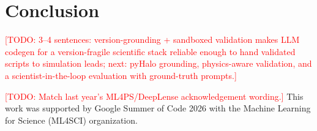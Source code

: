 \documentclass{article}
\newcommand{\todo}[1]{\textcolor{red}{[TODO: #1]}}
\begin{document}
\section{Conclusion}
\todo{3--4 sentences: version-grounding + sandboxed validation makes LLM codegen
for a version-fragile scientific stack reliable enough to hand validated scripts
to simulation leads; next: pyHalo grounding, physics-aware validation, and a
scientist-in-the-loop evaluation with ground-truth prompts.}

\begin{ack}
\todo{Match last year's ML4PS/DeepLense acknowledgement wording.} This work was
supported by Google Summer of Code 2026 with the Machine Learning for Science
(ML4SCI) organization.
\end{ack}



\end{document}
